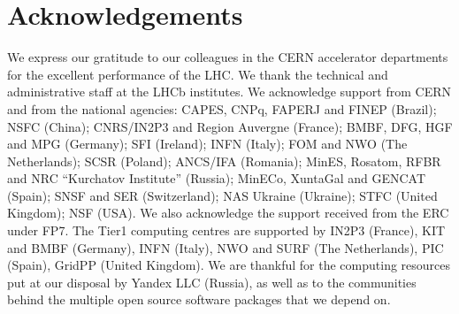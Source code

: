 \section*{Acknowledgements}

\noindent We express our gratitude to our colleagues in the CERN
accelerator departments for the excellent performance of the LHC. We
thank the technical and administrative staff at the LHCb
institutes. We acknowledge support from CERN and from the national
agencies: CAPES, CNPq, FAPERJ and FINEP (Brazil); NSFC (China);
CNRS/IN2P3 and Region Auvergne (France); BMBF, DFG, HGF and MPG
(Germany); SFI (Ireland); INFN (Italy); FOM and NWO (The Netherlands);
SCSR (Poland); ANCS/IFA (Romania); MinES, Rosatom, RFBR and NRC
``Kurchatov Institute'' (Russia); MinECo, XuntaGal and GENCAT (Spain);
SNSF and SER (Switzerland); NAS Ukraine (Ukraine); STFC (United
Kingdom); NSF (USA). We also acknowledge the support received from the
ERC under FP7. The Tier1 computing centres are supported by IN2P3
(France), KIT and BMBF (Germany), INFN (Italy), NWO and SURF (The
Netherlands), PIC (Spain), GridPP (United Kingdom). We are thankful
for the computing resources put at our disposal by Yandex LLC
(Russia), as well as to the communities behind the multiple open
source software packages that we depend on.
